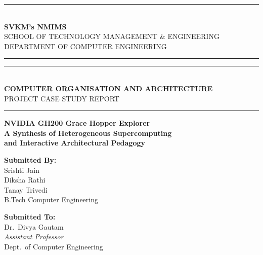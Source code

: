 \documentclass[12pt, a4paper]{article}
\begin{document}


\begin{titlepage}
  \centering
  \vspace*{0.8cm}
  
  \rule{0.25\textwidth}{0.8pt}\\[0.2cm]
  {\Large \textbf{SVKM's NMIMS}}\\[0.1cm]
  {\small SCHOOL OF TECHNOLOGY MANAGEMENT \& ENGINEERING}\\[0.1cm]
  {\footnotesize DEPARTMENT OF COMPUTER ENGINEERING}\\[0.2cm]
  \rule{0.25\textwidth}{0.8pt}

  \vspace{1.5cm}

  \rule{0.8\textwidth}{1.2pt}\\[0.5cm]
  {\Large \textbf{COMPUTER ORGANISATION AND ARCHITECTURE}}\\[0.2cm]
  {\large PROJECT CASE STUDY REPORT}\\[0.5cm]
  \rule{0.8\textwidth}{1.2pt}

  \vspace{1.2cm}
  
  {\huge\bfseries NVIDIA GH200 Grace Hopper Explorer}\\[0.4cm]
  {\large\bfseries A Synthesis of Heterogeneous Supercomputing}\\[0.2cm]
  {\large\bfseries and Interactive Architectural Pedagogy}

  \vspace{1.8cm}

  \begin{minipage}[t]{0.5\textwidth}
    \flushleft
    \textbf{Submitted By:}\\[0.4cm]
    \large Srishti Jain\\[0.1cm]
    \large Diksha Rathi\\[0.1cm]
    \large Tanay Trivedi\\[0.4cm]
    {\normalsize B.Tech Computer Engineering}
  \end{minipage}
  \hfill
  \begin{minipage}[t]{0.4\textwidth}
    \flushright
    \textbf{Submitted To:}\\[0.4cm]
    \large Dr.\ Divya Gautam\\[0.15cm]
    \normalsize\textit{Assistant Professor}\\
    \normalsize Dept.\ of Computer Engineering
  \end{minipage}


\end{titlepage}
\end{document}
